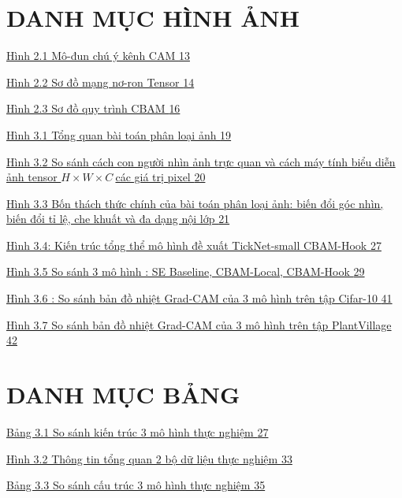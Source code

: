 \documentclass[
  12pt,
  a4paper,
]{report}
\begin{document}
\chapter*{DANH MỤC HÌNH ẢNH}\label{danh-mux1ee5c-huxecnh-ux1ea3nh}

\hyperref[_Toc236751521]{Hình 2.1 Mô-đun chú ý kênh CAM
\hyperref[_Toc236751521]{13}}

\hyperref[_Toc237274076]{Hình 2.2 Sơ đồ mạng nơ-ron Tensor
\hyperref[_Toc237274076]{14}}

\hyperref[_Toc236751523]{Hình 2.3 Sơ đồ quy trình CBAM
\hyperref[_Toc236751523]{16}}

\hyperref[_Toc236751524]{Hình 3.1 Tổng quan bài toán phân loại ảnh
\hyperref[_Toc236751524]{19}}

\hyperref[_Toc236751525]{Hình 3.2 So sánh cách con người nhìn ảnh trực
quan và cách máy tính biểu diễn ảnh tensor \(H \times W \times C\ \)các
giá trị pixel \hyperref[_Toc236751525]{20}}

\hyperref[_Toc236751526]{Hình 3.3 Bốn thách thức chính của bài toán phân
loại ảnh: biến đổi góc nhìn, biến đổi tỉ lệ, che khuất và đa dạng nội
lớp \hyperref[_Toc236751526]{21}}

\hyperref[_Toc236751527]{Hình 3.4: Kiến trúc tổng thể mô hình đề xuất
TickNet-small CBAM-Hook \hyperref[_Toc236751527]{27}}

\hyperref[_Toc236751528]{Hình 3.5 So sánh 3 mô hình : SE Baseline,
CBAM-Local, CBAM-Hook \hyperref[_Toc236751528]{29}}

\hyperref[_Toc236751529]{Hình 3.6 : So sánh bản đồ nhiệt Grad-CAM của 3
mô hình trên tập Cifar-10 \hyperref[_Toc236751529]{41}}

\hyperref[_Toc236751530]{Hình 3.7 So sánh bản đồ nhiệt Grad-CAM của 3 mô
hình trên tập PlantVillage \hyperref[_Toc236751530]{42}}

\chapter*{DANH MỤC BẢNG}\label{danh-mux1ee5c-bux1ea3ng}

\hyperref[_Toc236751806]{Bảng 3.1 So sánh kiến trúc 3 mô hình thực
nghiệm \hyperref[_Toc236751806]{27}}

\hyperref[_Toc236751807]{Hình 3.2 Thông tin tổng quan 2 bộ dữ liệu thực
nghiệm \hyperref[_Toc236751807]{33}}

\hyperref[_Toc236751808]{Bảng 3.3 So sánh cấu trúc 3 mô hình thực nghiệm
\hyperref[_Toc236751808]{35}}
\end{document}
